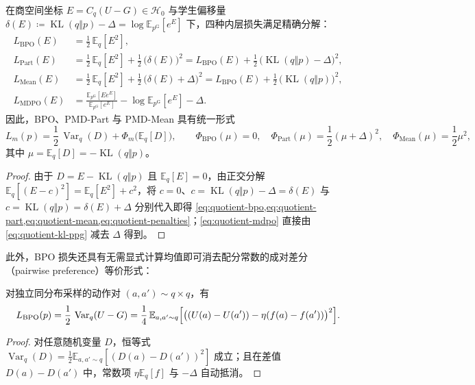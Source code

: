 \documentclass[lang=cn,scheme=chinese,openany]{../book/elegantbook}
\newcommand{\E}{\mathbb E}
\newcommand{\KL}{\operatorname{KL}}
\newcommand{\Var}{\operatorname{Var}}
\begin{document}
\begin{theorem}[四种内层损失的商空间正交分解]
\label{thm:quotient-losses}
在商空间坐标 $E=C_q(U-G)\in\mathcal H_0$ 与学生偏移量 $\delta(E)\coloneqq \KL(q\Vert p)-\Delta=\log\E_{p^{\mathrm G}}[e^E]$ 下，四种内层损失满足精确分解：
\begin{align}
 L_{\mathrm{BPO}}(E) &= \frac12\,\E_q[E^2], \label{eq:quotient-bpo}\\
 L_{\mathrm{Part}}(E) &= \frac12\,\E_q[E^2]+\frac12\,\bigl(\delta(E)\bigr)^2
 = L_{\mathrm{BPO}}(E)+\frac12\,\bigl(\KL(q\Vert p)-\Delta\bigr)^2, \label{eq:quotient-part}\\
 L_{\mathrm{Mean}}(E) &= \frac12\,\E_q[E^2]+\frac12\,\bigl(\delta(E)+\Delta\bigr)^2
 = L_{\mathrm{BPO}}(E)+\frac12\,\bigl(\KL(q\Vert p)\bigr)^2, \label{eq:quotient-mean}\\
 L_{\mathrm{MDPO}}(E) &= \frac{\E_{p^{\mathrm G}}[E e^E]}{\E_{p^{\mathrm G}}[e^E]}-\log\E_{p^{\mathrm G}}[e^E]-\Delta. \label{eq:quotient-mdpo}
\end{align}
因此，BPO、PMD-Part 与 PMD-Mean 具有统一形式
\begin{equation}
 L_m(p)=\frac12\,\Var_q(D)+\Phi_m\bigl(\E_q[D]\bigr),
 \qquad
 \Phi_{\mathrm{BPO}}(\mu)=0,\quad
 \Phi_{\mathrm{Part}}(\mu)=\frac12(\mu+\Delta)^2,\quad
 \Phi_{\mathrm{Mean}}(\mu)=\frac12\mu^2,
 \label{eq:quotient-penalties}
\end{equation}
其中 $\mu=\E_q[D]=-\KL(q\Vert p)$。
\end{theorem}
\begin{proof}
由于 $D=E-\KL(q\Vert p)$ 且 $\E_q[E]=0$，由正交分解 $\E_q[(E-c)^2]=\E_q[E^2]+c^2$，将 $c=0$、$c=\KL(q\Vert p)-\Delta=\delta(E)$ 与 $c=\KL(q\Vert p)=\delta(E)+\Delta$ 分别代入即得 \cref{eq:quotient-bpo,eq:quotient-part,eq:quotient-mean,eq:quotient-penalties}；\cref{eq:quotient-mdpo} 直接由 \cref{eq:quotient-kl-ppg} 减去 $\Delta$ 得到。
\end{proof}

此外，BPO 损失还具有无需显式计算均值即可消去配分常数的成对差分（pairwise preference）等价形式：
\begin{proposition}
\label{prop:quotient-pairwise}
对独立同分布采样的动作对 $(a,a')\sim q\times q$，有
\begin{equation}
 L_{\mathrm{BPO}}(p)
 =\frac12\,\Var_q(U-G)
 =\frac14\,\E_{a,a'\sim q}\Bigl[\bigl((U(a)-U(a'))-\eta(f(a)-f(a'))\bigr)^2\Bigr].
 \label{eq:bpo-pairwise}
\end{equation}
\end{proposition}
\begin{proof}
对任意随机变量 $D$，恒等式 $\Var_q(D)=\frac12\E_{a,a'\sim q}[(D(a)-D(a'))^2]$ 成立；且在差值 $D(a)-D(a')$ 中，常数项 $\eta\E_q[f]$ 与 $-\Delta$ 自动抵消。
\end{proof}
\end{document}
